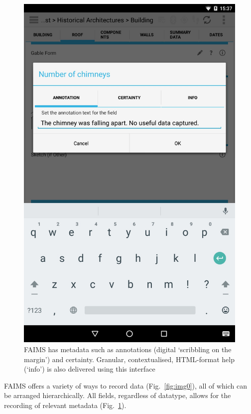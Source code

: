 \documentclass[preprint,12pt, a4paper]{elsarticle}
\begin{document}
\begin{figure}[!htb]
	\includegraphics[width=\linewidth]{image-1.jpg}
	\caption{FAIMS has metadata such as annotations (digital `scribbling on the margin') and certainty. Granular, contextualised, HTML-format help (`info') is also delivered using this interface}
	\label{fig:img1}
\endminipage\hfill

\end{figure}

FAIMS offers a variety of ways to record data (Fig.~\ref{fig:img0}), all of which can be arranged hierarchically. All fields, regardless of datatype, allows for the recording of relevant metadata (Fig.~\ref{fig:img1}).
\end{document}
